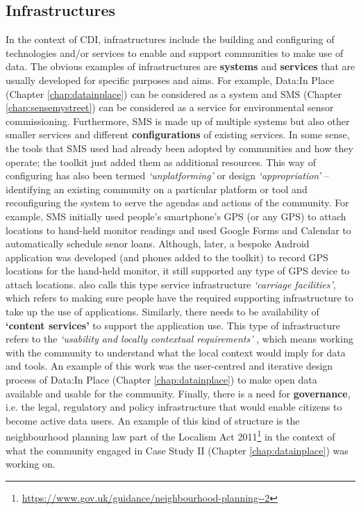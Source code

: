 \subsection{Infrastructures}
In the context of CDI, infrastructures include the building and configuring of technologies and/or services to enable and support communities to make use of data. The obvious examples of infrastructures are \textbf{systems} and \textbf{services} that are usually developed for specific purposes and aims. For example, Data:In Place (Chapter \ref{chap:datainplace}) can be considered as a system and SMS (Chapter \ref{chap:sensemystreet}) can be considered as a service for environmental sensor commissioning. Furthermore, SMS is made up of multiple systems but also other smaller services and different \textbf{configurations} of existing services. In some sense, the tools that SMS used had already been adopted by communities and how they operate; the toolkit just added them as additional resources. This way of configuring has also been termed \textit{`unplatforming'} \citep{lambton-howard_whatfutures_2019} or design \textit{`appropriation'} \citep{dix_designing_2007} -- identifying an existing community on a particular platform or tool and reconfiguring the system to serve the agendas and actions of the community. For example, SMS initially used people's smartphone's GPS (or any GPS) to attach locations to hand-held monitor readings and used Google Forms and Calendar to automatically schedule senor loans. Although, later, a bespoke Android application was developed (and phones added to the toolkit) to record GPS locations for the hand-held monitor, it still supported any type of GPS device to attach locations. \cite{gurstein_effective_2003} also calls this type service infrastructure \textit{`carriage facilities'}, which refers to making sure people have the required supporting infrastructure to take up the use of applications. Similarly, there needs to be availability of \textbf{`content services'} to support the application use. This type of infrastructure refers to the \textit{`usability and locally contextual requirements'} \citep{gurstein_effective_2003}, which means working with the community to understand what the local context would imply for data and tools. An example of this work was the user-centred and iterative design process of Data:In Place (Chapter \ref{chap:datainplace}) to make open data available and usable for the community. Finally, there is a need for \textbf{governance}, i.e. the legal, regulatory and policy infrastructure that would enable citizens to become active data users. An example of this kind of structure is the neighbourhood planning law part of the Localism Act 2011\footnote{\url{https://www.gov.uk/guidance/neighbourhood-planning--2}} in the context of what the community engaged in Case Study II (Chapter \ref{chap:datainplace}) was working on.

